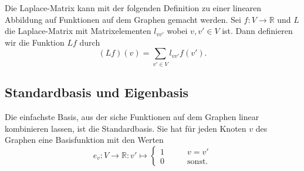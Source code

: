 Die Laplace-Matrix kann mit der folgenden Definition zu einer linearen
Abbildung auf Funktionen auf dem Graphen gemacht werden.
Sei $f\colon V\to \mathbb{R}$ und $L$ die Laplace-Matrix mit
Matrixelementen $l_{vv'}$ wobei $v,v'\in V$ ist.
Dann definieren wir die Funktion $Lf$ durch
\[
(Lf)(v)
=
\sum_{v'\in V} l_{vv'}f(v').
\]

\subsection{Standardbasis und Eigenbasis
\label{buch:subsection:standardbasis-und-eigenbasis}}
Die einfachste Basis, aus der siche Funktionen auf dem Graphen linear
kombinieren lassen, ist die Standardbasis.
Sie hat für jeden Knoten $v$ des Graphen eine Basisfunktion mit den Werten
\[
e_v\colon V\to\mathbb R:v'\mapsto \begin{cases}
1\qquad&v=v'\\
0\qquad&\text{sonst.}
\end{cases}
\]



